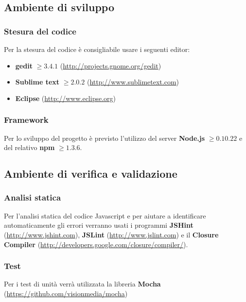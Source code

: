 	\subsection{Ambiente di sviluppo}
		
		\subsubsection{Stesura del codice}
		
		Per la stesura del codice è consigliabile usare i seguenti editor:
		\begin{itemize}
			\item \textbf{gedit} $\geq 3.4.1$ (\url{http://projects.gnome.org/gedit})
			\item \textbf{Sublime text} $\geq 2.0.2$ (\url{http://www.sublimetext.com})
			\item \textbf{Eclipse} (\url{http://www.eclipse.org})
		\end{itemize}
		
		\subsubsection{Framework}
		
		Per lo sviluppo del progetto è previsto l'utilizzo del server \textbf{Node.js} $\geq 0.10.22$ e del relativo  \textbf{npm} $\geq 1.3.6$.

	\subsection{Ambiente di verifica e validazione}
		\subsubsection{Analisi statica}
		
		Per l'analisi statica del codice Javascript e per aiutare a identificare automaticamente gli errori verranno usati i programmi \textbf{JSHint} (\url{http://www.jshint.com}), \textbf{JSLint} (\url{http://www.jslint.com}) e il \textbf{Closure Compiler} (\url{http://developers.google.com/closure/compiler/}).
		
		
		\subsubsection{Test}
		
		Per i test di unità verrà utilizzata la libreria \textbf{Mocha} (\url{https://github.com/visionmedia/mocha})
		
		
